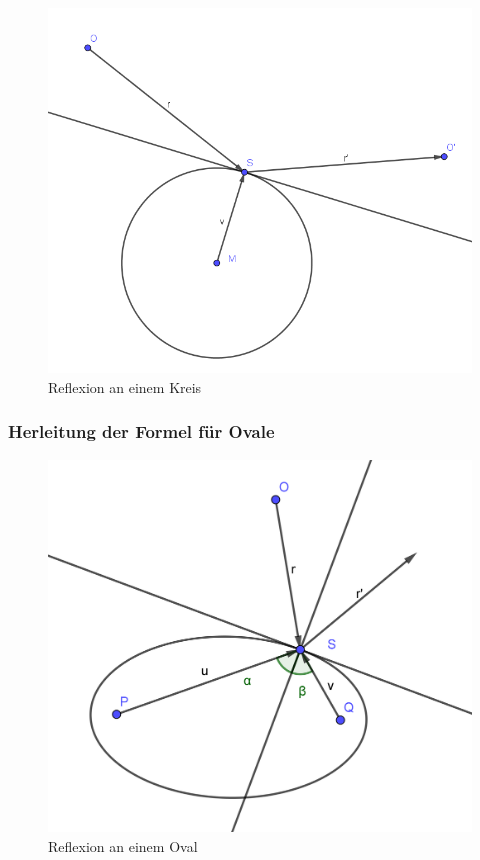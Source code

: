 \documentclass[reducespace,stylepage,semiarbeit]{spezidoc}
\begin{document}
\begin{figure}[h]
\centering
\includegraphics[scale=0.5]{pictures/CircleRef.png}
\caption{Reflexion an einem Kreis}
\end{figure}

\newpage
\subsubsection*{Herleitung der Formel für Ovale}

\begin{figure}[h]
\centering
\includegraphics[scale=1]{pictures/OvalRef.png}
\caption{Reflexion an einem Oval}
\end{figure}
\end{document}
